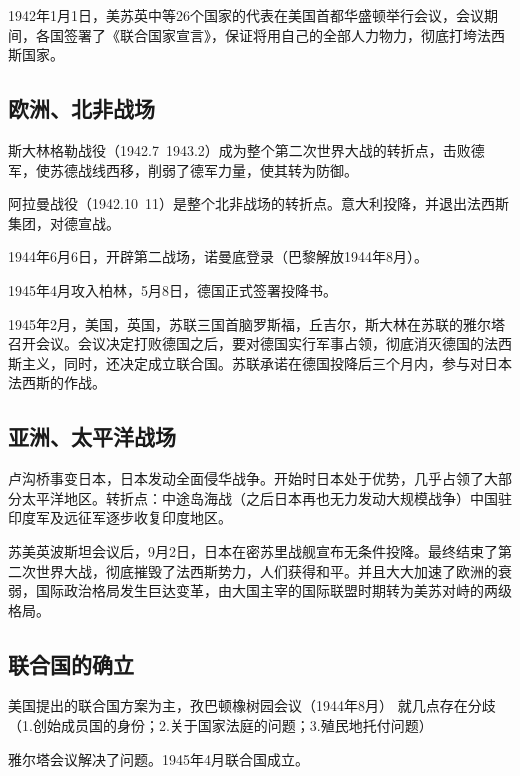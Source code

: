 1942年1月1日，美苏英中等26个国家的代表在美国首都华盛顿举行会议，会议期间，各国签署了《联合国家宣言》，保证将用自己的全部人力物力，彻底打垮法西斯国家。

\subsection{欧洲、北非战场}
斯大林格勒战役（1942.7~1943.2）成为整个第二次世界大战的转折点，击败德军，使苏德战线西移，削弱了德军力量，使其转为防御。

阿拉曼战役（1942.10~11）是整个北非战场的转折点。意大利投降，并退出法西斯集团，对德宣战。

1944年6月6日，开辟第二战场，诺曼底登录（巴黎解放1944年8月）。

1945年4月攻入柏林，5月8日，德国正式签署投降书。

1945年2月，美国，英国，苏联三国首脑罗斯福，丘吉尔，斯大林在苏联的雅尔塔召开会议。会议决定打败德国之后，要对德国实行军事占领，彻底消灭德国的法西斯主义，同时，还决定成立联合国。苏联承诺在德国投降后三个月内，参与对日本法西斯的作战。

\subsection{亚洲、太平洋战场}
卢沟桥事变日本，日本发动全面侵华战争。开始时日本处于优势，几乎占领了大部分太平洋地区。转折点：中途岛海战（之后日本再也无力发动大规模战争）中国驻印度军及远征军逐步收复印度地区。

苏美英波斯坦会议后，9月2日，日本在密苏里战舰宣布无条件投降。最终结束了第二次世界大战，彻底摧毁了法西斯势力，人们获得和平。并且大大加速了欧洲的衰弱，国际政治格局发生巨达变革，由大国主宰的国际联盟时期转为美苏对峙的两级格局。

\subsection{联合国的确立}
美国提出的联合国方案为主，孜巴顿橡树园会议（1944年8月）
就几点存在分歧（1.创始成员国的身份；2.关于国家法庭的问题；3.殖民地托付问题）

雅尔塔会议解决了问题。1945年4月联合国成立。

